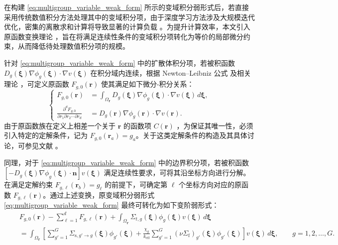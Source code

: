 \documentclass[final,3p,times,sort&compress]{elsarticle}
\begin{document}
{\color{black}
在构建 \cref{eq:multigroup_variable_weak_form} 所示的变域积分弱形式后，若直接采用传统数值积分方法处理其中的变域积分项，由于深度学习方法涉及大规模迭代优化，密集的离散求和计算将导致显著的计算负载 \cite{liu2025neutron, guan2022solving, sun2023binn, guo2022physics}。为提升计算效率，本文引入原函数变换理论 \cite{LiuDong2025DuoWeiLian}，旨在将满足连续性条件的变域积分项转化为等价的局部微分约束，从而降低待处理数值积分项的规模。

针对 \cref{eq:multigroup_variable_weak_form} 中的扩散体积分项，若被积函数 $D_g(\boldsymbol \xi) \nabla \phi_g(\boldsymbol \xi) \cdot \nabla v(\boldsymbol \xi)$ 在积分域内连续，根据 Newton--Leibniz 公式 \cite{courant1999introduction} 及相关理论 \cite{LiuDong2025DuoWeiLian}，可定义原函数 $F_{g,0}(\boldsymbol r)$ 使其满足如下微分-积分关系：
\begin{equation}
    \left\{
    \begin{aligned}
        F_{g,0}(\boldsymbol r) &= \int_{\Omega_{\boldsymbol r}} D_g(\boldsymbol \xi) \nabla \phi_g(\boldsymbol \xi) \cdot \nabla v(\boldsymbol \xi) \,d\boldsymbol \xi , \\
        \frac{\partial^d F_{g,0}}{\partial r_1\partial r_2\cdots\partial r_d} &= D_g(\boldsymbol r) \nabla \phi_g(\boldsymbol r) \cdot \nabla v(\boldsymbol r) .
    \end{aligned}
    \right.
    \label{eq:Fg0_integral}
\end{equation}
由于原函数族在定义上相差一个关于 $\boldsymbol{r}$ 的函数项 $C(\boldsymbol{r})$ \cite{courant1999introduction}，为保证其唯一性，必须引入特定的定解条件，记为 $F_{g,0}({\boldsymbol{r}}_{a}) = {g}_{a}$。关于这类定解条件的构造及其具体讨论，可参见文献 \cite{LiuDong2025DuoWeiLian, LiuDong2025MianXiangShen, LiuDong2026MianXiangShen}。

同理，对于 \cref{eq:multigroup_variable_weak_form} 中的边界积分项，若被积函数 $\left[ -D_g(\boldsymbol \xi) \nabla \phi_g(\boldsymbol \xi) \cdot \boldsymbol n \right] v(\boldsymbol \xi)$ 满足连续性要求，可将其沿坐标方向进行分解。在满足定解约束 $F_{g,\ell}(\boldsymbol r_b) = {g}_{\ell}$ 的前提下，可确定第 $\ell$ 个坐标方向对应的原函数 $F_{g,\ell}(\boldsymbol r)$。通过上述变换，原变域积分弱形式 \cref{eq:multigroup_variable_weak_form} 最终可转化为如下变阶弱形式：
\begin{equation}
    \begin{aligned}
    & F_{g,0}(\boldsymbol r) - \sum_{\ell=1}^{d}F_{g,\ell}(\boldsymbol r) + \int_{\Omega_{\boldsymbol r}} \Sigma_{t,g}(\boldsymbol \xi) \phi_g(\boldsymbol \xi) v(\boldsymbol \xi) \,d\boldsymbol \xi \\
    \quad & =
    \int_{\Omega_{\boldsymbol r}}
    \left[
    \sum_{g'=1}^{G}
    \Sigma_{\mathrm{s},g'\to g}(\boldsymbol \xi)
    \phi_{g'}(\boldsymbol \xi)
    +
    \frac{\chi_g}{k_{\mathrm{eff}}}
    \sum_{g'=1}^{G}
    \left(\nu\Sigma_{\mathrm{f}}\right)_{g'}(\boldsymbol \xi)
    \phi_{g'}(\boldsymbol \xi)
    \right]
    v(\boldsymbol \xi)\,d\boldsymbol \xi ,
    \qquad g=1,2,\ldots,G .
    \end{aligned}
    \label{eq:variable_order_mg_main}
\end{equation}
}
\end{document}

